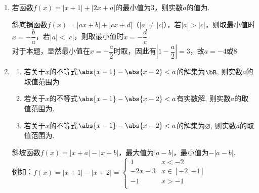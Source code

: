 \begin{enumerate}
    \begin{jieda}
        平底锅函数，可以应用三角不等式$|a|+|b| \geq |a+b|$求最小值
    \end{jieda}
    \item 若函数$f(x) = |x+1| + |2x+a|$的最小值为3，则实数$a$的值为.
    \begin{jieda}
        斜底锅函数$f(x) = |ax+b|+|cx+d|$（$|a| \neq |c|$），若$|a| > |c|$，则取最小值时$x = -\dfrac{b}{a}$，若$|a| < |c|$，则取最小值时$x = -\dfrac{d}{c}$\\
        对于本题，显然最小值在$x = -\dfrac{a}{2}$时取，因此有$|1-\dfrac{a}{2}| = 3$，故$a = -4 \mbox{或} 8$
    \end{jieda}
    \item 
    \begin{enumerate}
        \item  若关于$x$的不等式$\abs{x-1}-\abs{x-2}<a$的解集为$\bR$, 则实数$a$的取值范围为
        
        \item 若关于$x$的不等式$\abs{x-1}-\abs{x-2}<a$有实数解, 则实数$a$的取值范围为. 
        
        \item 若关于$x$的不等式$\abs{x-1}-\abs{x-2}<a$的解集为$\varnothing$, 则实数$a$的取值范围为. 
    \end{enumerate}
    \begin{jieda}
        斜坡函数$f(x) = |x+a|-|x+b|$，最大值为$|a-b|$，最小值为$-|a-b|$. \\
        例如：$f(x) = |x+1|-|x+2| = \left \{ \begin{array}{ll}
            1 & x < -2 \\
            -2x-3 & x \in [-2, -1] \\
            -1 & x > -1 \\
        \end{array}\right.$
    \end{jieda}

    
\end{enumerate}

